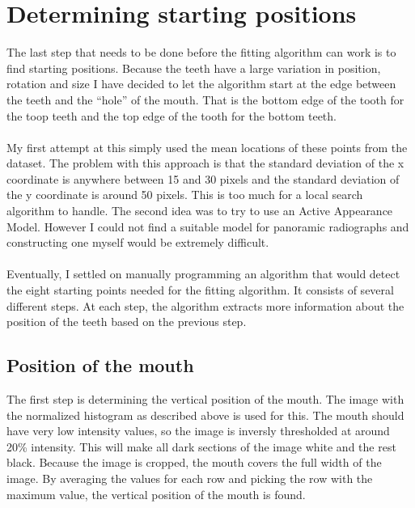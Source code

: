 \documentclass[a4paper,10pt]{article}
\begin{document}
\section{Determining starting positions}
The last step that needs to be done before the fitting algorithm can work is to find starting positions. Because the teeth have a large variation in position, rotation and size I have decided to let the algorithm start at the edge between the teeth and the ``hole'' of the mouth. That is the bottom edge of the tooth for the toop teeth and the top edge of the tooth for the bottom teeth.
\\\\
My first attempt at this simply used the mean locations of these points from the dataset. The problem with this approach is that the standard deviation of the x coordinate is anywhere between 15 and 30 pixels and the standard deviation of the y coordinate is around 50 pixels. This is too much for a local search algorithm to handle. The second idea was to try to use an Active Appearance Model. However I could not find a suitable model for panoramic radiographs and constructing one myself would be extremely difficult.
\\\\
Eventually, I settled on manually programming an algorithm that would detect the eight starting points needed for the fitting algorithm. It consists of several different steps. At each step, the algorithm extracts more information about the position of the teeth based on the previous step.

\subsection{Position of the mouth}
The first step is determining the vertical position of the mouth. The image with the normalized histogram as described above is used for this. The mouth should have very low intensity values, so the image is inversly thresholded at around 20\% intensity. This will make all dark sections of the image white and the rest black. Because the image is cropped, the mouth covers the full width of the image. By averaging the values for each row and picking the row with the maximum value, the vertical position of the mouth is found.
\end{document}
